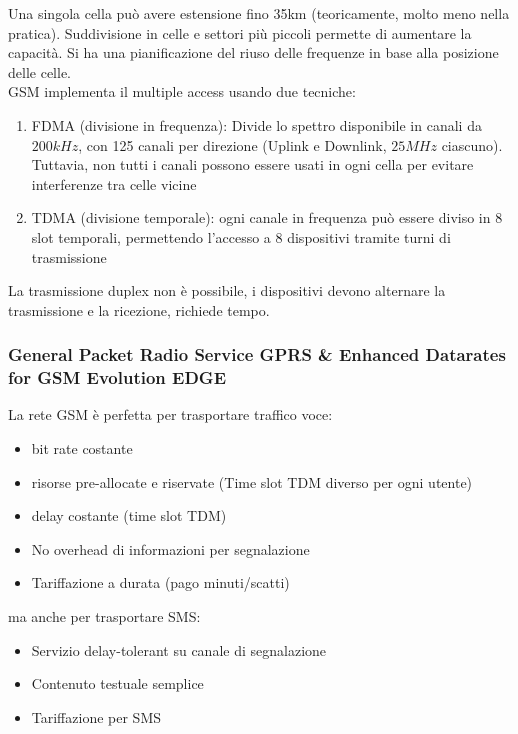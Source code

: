 Una singola cella può avere estensione fino 35km (teoricamente, molto meno nella pratica). Suddivisione in celle e settori più piccoli permette di aumentare la capacità. Si ha una pianificazione del riuso delle frequenze in base alla posizione delle celle.\\

GSM implementa il multiple access usando due tecniche: 
\begin{enumerate}
	\item FDMA (divisione in frequenza): Divide lo spettro disponibile in canali da $200 kHz$, con 125 canali per direzione (Uplink e Downlink, $25MHz$ ciascuno). Tuttavia, non tutti i canali possono essere usati in ogni cella per evitare interferenze tra celle vicine
	\item TDMA (divisione temporale): ogni canale in frequenza può essere diviso in 8 slot temporali, permettendo l'accesso a 8 dispositivi tramite turni di trasmissione
\end{enumerate}

La trasmissione duplex non è possibile, i dispositivi devono alternare la trasmissione e la ricezione, richiede tempo. \\

\subsubsection{General Packet Radio Service GPRS \& Enhanced Datarates for GSM Evolution EDGE}

La rete GSM è perfetta per trasportare traffico voce: 
\begin{itemize}
	\item bit rate costante
	\item risorse pre-allocate e riservate (Time slot TDM diverso per ogni utente)
	\item delay costante (time slot TDM)
	\item No overhead di informazioni per segnalazione
	\item Tariffazione a durata (pago minuti/scatti)
\end{itemize}
ma anche per trasportare SMS:
\begin{itemize}
	\item Servizio delay-tolerant su canale di segnalazione
	\item Contenuto testuale semplice
	\item Tariffazione per SMS
\end{itemize}

